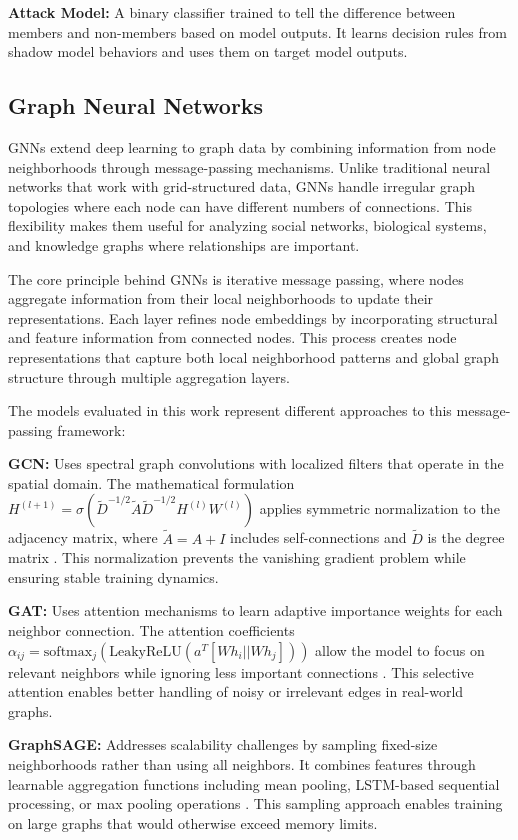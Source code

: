\documentclass{article}
\begin{document}
\textbf{Attack Model:} A binary classifier trained to tell the difference between members and non-members based on model outputs. It learns decision rules from shadow model behaviors and uses them on target model outputs.

\subsection{Graph Neural Networks}
GNNs extend deep learning to graph data by combining information from node neighborhoods through message-passing mechanisms. Unlike traditional neural networks that work with grid-structured data, GNNs handle irregular graph topologies where each node can have different numbers of connections. This flexibility makes them useful for analyzing social networks, biological systems, and knowledge graphs where relationships are important.

The core principle behind GNNs is iterative message passing, where nodes aggregate information from their local neighborhoods to update their representations. Each layer refines node embeddings by incorporating structural and feature information from connected nodes. This process creates node representations that capture both local neighborhood patterns and global graph structure through multiple aggregation layers.

The models evaluated in this work represent different approaches to this message-passing framework:

\textbf{GCN:} Uses spectral graph convolutions with localized filters that operate in the spatial domain. The mathematical formulation $H^{(l+1)} = \sigma(\tilde{D}^{-1/2}\tilde{A}\tilde{D}^{-1/2}H^{(l)}W^{(l)})$ applies symmetric normalization to the adjacency matrix, where $\tilde{A} = A + I$ includes self-connections and $\tilde{D}$ is the degree matrix \cite{kipf2017semi}. This normalization prevents the vanishing gradient problem while ensuring stable training dynamics.

\textbf{GAT:} Uses attention mechanisms to learn adaptive importance weights for each neighbor connection. The attention coefficients $\alpha_{ij} = \text{softmax}_j(\text{LeakyReLU}(a^T[Wh_i||Wh_j]))$ allow the model to focus on relevant neighbors while ignoring less important connections \cite{velickovic2018graph}. This selective attention enables better handling of noisy or irrelevant edges in real-world graphs.

\textbf{GraphSAGE:} Addresses scalability challenges by sampling fixed-size neighborhoods rather than using all neighbors. It combines features through learnable aggregation functions including mean pooling, LSTM-based sequential processing, or max pooling operations \cite{hamilton2017inductive}. This sampling approach enables training on large graphs that would otherwise exceed memory limits.
\end{document}
